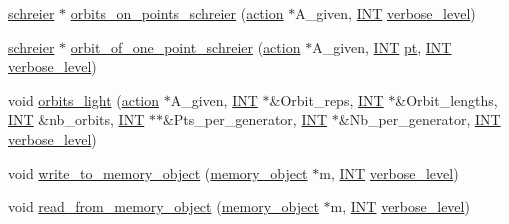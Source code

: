 \begin{DoxyCompactItemize}
\item 
\mbox{\hyperlink{classschreier}{schreier}} $\ast$ \mbox{\hyperlink{classstrong__generators_adf3f35989ff7ac9fdbcf0a4e241eef9f}{orbits\+\_\+on\+\_\+points\+\_\+schreier}} (\mbox{\hyperlink{classaction}{action}} $\ast$A\+\_\+given, \mbox{\hyperlink{galois_8h_a09fddde158a3a20bd2dcadb609de11dc}{I\+NT}} \mbox{\hyperlink{simeon_8_c_a818073fbcc2f439e7c56952f67386122}{verbose\+\_\+level}})
\item 
\mbox{\hyperlink{classschreier}{schreier}} $\ast$ \mbox{\hyperlink{classstrong__generators_aff6b604139d48c44f724f1056da5e66e}{orbit\+\_\+of\+\_\+one\+\_\+point\+\_\+schreier}} (\mbox{\hyperlink{classaction}{action}} $\ast$A\+\_\+given, \mbox{\hyperlink{galois_8h_a09fddde158a3a20bd2dcadb609de11dc}{I\+NT}} \mbox{\hyperlink{clique__finder_8_c_aec1f1a2b30fdca8844c2932384483145}{pt}}, \mbox{\hyperlink{galois_8h_a09fddde158a3a20bd2dcadb609de11dc}{I\+NT}} \mbox{\hyperlink{simeon_8_c_a818073fbcc2f439e7c56952f67386122}{verbose\+\_\+level}})
\item 
void \mbox{\hyperlink{classstrong__generators_aea6b67ded330adf1b74fe916707c9b0e}{orbits\+\_\+light}} (\mbox{\hyperlink{classaction}{action}} $\ast$A\+\_\+given, \mbox{\hyperlink{galois_8h_a09fddde158a3a20bd2dcadb609de11dc}{I\+NT}} $\ast$\&Orbit\+\_\+reps, \mbox{\hyperlink{galois_8h_a09fddde158a3a20bd2dcadb609de11dc}{I\+NT}} $\ast$\&Orbit\+\_\+lengths, \mbox{\hyperlink{galois_8h_a09fddde158a3a20bd2dcadb609de11dc}{I\+NT}} \&nb\+\_\+orbits, \mbox{\hyperlink{galois_8h_a09fddde158a3a20bd2dcadb609de11dc}{I\+NT}} $\ast$$\ast$\&Pts\+\_\+per\+\_\+generator, \mbox{\hyperlink{galois_8h_a09fddde158a3a20bd2dcadb609de11dc}{I\+NT}} $\ast$\&Nb\+\_\+per\+\_\+generator, \mbox{\hyperlink{galois_8h_a09fddde158a3a20bd2dcadb609de11dc}{I\+NT}} \mbox{\hyperlink{simeon_8_c_a818073fbcc2f439e7c56952f67386122}{verbose\+\_\+level}})
\item 
void \mbox{\hyperlink{classstrong__generators_a04fc01097cf580dced1e46779b20a1b3}{write\+\_\+to\+\_\+memory\+\_\+object}} (\mbox{\hyperlink{classmemory__object}{memory\+\_\+object}} $\ast$m, \mbox{\hyperlink{galois_8h_a09fddde158a3a20bd2dcadb609de11dc}{I\+NT}} \mbox{\hyperlink{simeon_8_c_a818073fbcc2f439e7c56952f67386122}{verbose\+\_\+level}})
\item 
void \mbox{\hyperlink{classstrong__generators_a2cc8e0c6f0525f8840bbf77ae23f7716}{read\+\_\+from\+\_\+memory\+\_\+object}} (\mbox{\hyperlink{classmemory__object}{memory\+\_\+object}} $\ast$m, \mbox{\hyperlink{galois_8h_a09fddde158a3a20bd2dcadb609de11dc}{I\+NT}} \mbox{\hyperlink{simeon_8_c_a818073fbcc2f439e7c56952f67386122}{verbose\+\_\+level}})
$$
\end{DoxyCompactItemize}
